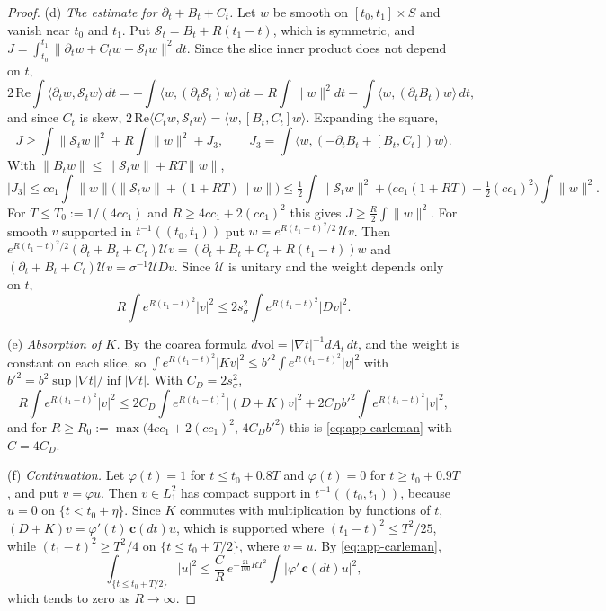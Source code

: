 \documentclass[11pt]{amsart}
\theoremstyle{definition}
\theoremstyle{remark}
\theoremstyle{plain}
\numberwithin{equation}{section}
\begin{document}
\begin{proof}
(d) \emph{The estimate for $\partial_t+B_t+C_t$.} Let $w$ be smooth on $[t_0,t_1]\times S$ and
vanish near $t_0$ and $t_1$. Put $\mathcal S_t=B_t+R(t_1-t)$, which is symmetric, and
$J=\int_{t_0}^{t_1}\|\partial_tw+C_tw+\mathcal S_tw\|^2dt$. Since the slice inner product does not depend
on $t$,
\[
2\,\mathrm{Re}\int\langle\partial_tw,\mathcal S_tw\rangle\,dt=-\int\langle w,(\partial_t\mathcal S_t)w\rangle\,dt
=R\int\|w\|^2dt-\int\langle w,(\partial_tB_t)w\rangle\,dt ,
\]
and since $C_t$ is skew, $2\,\mathrm{Re}\langle C_tw,\mathcal S_tw\rangle=\langle w,[B_t,C_t]w\rangle$.
Expanding the square,
\[
J\ge\int\|\mathcal S_tw\|^2+R\int\|w\|^2+J_3,\qquad
J_3=\int\langle w,(-\partial_tB_t+[B_t,C_t])w\rangle .
\]
With $\|B_tw\|\le\|\mathcal S_tw\|+RT\|w\|$,
\[
|J_3|\le cc_1\int\|w\|\bigl(\|\mathcal S_tw\|+(1+RT)\|w\|\bigr)
\le\tfrac12\int\|\mathcal S_tw\|^2+\bigl(cc_1(1+RT)+\tfrac12(cc_1)^2\bigr)\int\|w\|^2 .
\]
For $T\le T_0:=1/(4cc_1)$ and $R\ge4cc_1+2(cc_1)^2$ this gives $J\ge\frac R2\int\|w\|^2$. For
smooth $v$ supported in $t^{-1}((t_0,t_1))$ put $w=e^{R(t_1-t)^2/2}\,\mathcal Uv$. Then
$e^{R(t_1-t)^2/2}(\partial_t+B_t+C_t)\mathcal Uv=(\partial_t+B_t+C_t+R(t_1-t))w$ and
$(\partial_t+B_t+C_t)\mathcal Uv=\sigma^{-1}\mathcal UDv$. Since $\mathcal U$ is unitary and the
weight depends only on $t$,
\[
R\int e^{R(t_1-t)^2}|v|^2\le 2s_\sigma^2\int e^{R(t_1-t)^2}|Dv|^2 .
\]

(e) \emph{Absorption of $K$.} By the coarea formula $d\mathrm{vol}=|\nabla t|^{-1}dA_t\,dt$, and
the weight is constant on each slice, so
$\int e^{R(t_1-t)^2}|Kv|^2\le b'^2\int e^{R(t_1-t)^2}|v|^2$ with
$b'^2=b^2\sup|\nabla t|/\inf|\nabla t|$. With $C_D=2s_\sigma^2$,
\[
R\int e^{R(t_1-t)^2}|v|^2\le2C_D\int e^{R(t_1-t)^2}|(D+K)v|^2+2C_Db'^2\int e^{R(t_1-t)^2}|v|^2 ,
\]
and for $R\ge R_0:=\max\bigl(4cc_1+2(cc_1)^2,\,4C_Db'^2\bigr)$ this is \eqref{eq:app-carleman}
with $C=4C_D$.

(f) \emph{Continuation.} Let $\varphi(t)=1$ for $t\le t_0+0.8T$ and $\varphi(t)=0$ for
$t\ge t_0+0.9T$, and put $v=\varphi u$. Then $v\in L^2_1$ has compact support in
$t^{-1}((t_0,t_1))$, because $u=0$ on $\{t<t_0+\eta\}$. Since $K$ commutes with multiplication by
functions of $t$, $(D+K)v=\varphi'(t)\,\mathbf c(dt)u$, which is supported where
$(t_1-t)^2\le T^2/25$, while $(t_1-t)^2\ge T^2/4$ on $\{t\le t_0+T/2\}$, where $v=u$. By
\eqref{eq:app-carleman},
\[
\int_{\{t\le t_0+T/2\}}|u|^2\le\frac CR\,e^{-\frac{21}{100}RT^2}\int|\varphi'\,\mathbf c(dt)u|^2 ,
\]
which tends to zero as $R\to\infty$.
\end{proof}
\end{document}
